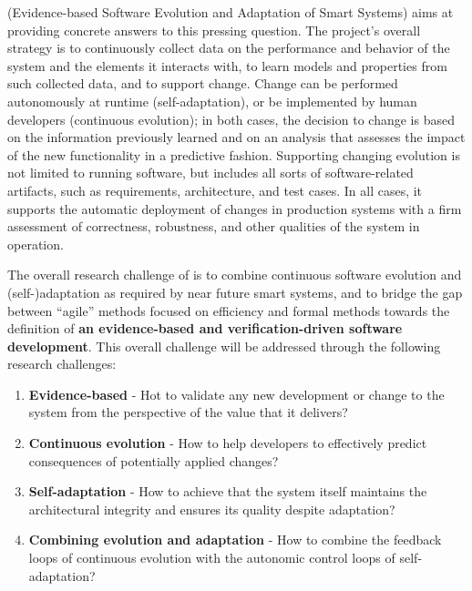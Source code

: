 \documentclass[12pt]{article}
\begin{document}
\name{} (Evidence-based Software Evolution and Adaptation of Smart Systems) 
aims at providing concrete answers to this pressing question. The project's overall strategy is to continuously collect data on the performance and behavior of the system and the elements it interacts with, to learn models and properties from such collected data, and to support change. %
Change can be performed autonomously at runtime (self-adaptation), or be implemented by human developers (continuous evolution); in both cases, the decision to change is based on the information previously learned and on an analysis that assesses the impact of the new functionality in a predictive fashion. %
Supporting changing evolution is not limited to running software, but includes all sorts of software-related artifacts, such as requirements, architecture, and test cases.
In all cases, it supports the automatic deployment of changes in production systems with a firm assessment of correctness, robustness, and other qualities of the system in operation.

The overall research challenge of \name{} is to combine continuous software evolution and (self-)adaptation as required by near future smart systems, and to
bridge the gap between ``agile'' methods focused on efficiency and formal methods towards the definition of {\bf an evidence-based and verification-driven software development}. This overall challenge will be addressed through the following research challenges:

\begin{enumerate}
\item {\bf Evidence-based} - Hot to validate any new development or change to the system from the perspective of the value that it delivers?\vspace{-.1cm}
\item {\bf Continuous evolution} - How to help developers to effectively predict consequences of potentially applied changes?\vspace{-.1cm}
\item {\bf Self-adaptation} - How to achieve that the system itself maintains the architectural integrity and ensures its quality despite adaptation?\vspace{-.1cm}
\item {\bf Combining evolution and adaptation} - How to combine the feedback loops of continuous evolution with the autonomic control loops of self-adaptation?
\end{enumerate}
\end{document}
